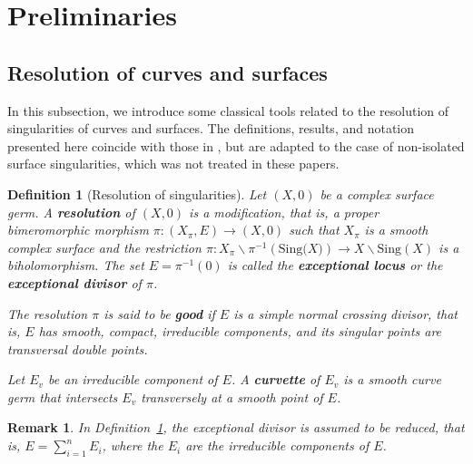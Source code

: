 \documentclass[reqno,dvipsnames,12pt]{amsart}
\renewcommand{\setminus}{\smallsetminus}
\newtheorem{rema}[thm]{Remark}
\newtheorem{defi}[thm]{Definition}
\begin{document}
\newpage






\tableofcontents
\section{Preliminaries}





\subsection{Resolution of curves and surfaces}\label{section1}

In this subsection, we introduce some classical tools related to the resolution of singularities of curves and surfaces. The definitions, results, and notation presented here coincide with those in \cite{yenni1, yenni2}, but are adapted to the case of non-isolated surface singularities, which was not treated in these papers.






\begin{defi}[Resolution of singularities]\label{Resolution of singularities}
Let $(X,0)$ be a complex surface germ. A \textbf{resolution} of $(X,0)$ is a \textit{modification}, that is, a proper bimeromorphic morphism
$\pi : (X_\pi, E) \to (X,0)$
such that $X_\pi$ is a smooth complex surface and the restriction
$\pi : X_\pi \setminus \pi^{-1}\left({\mathrm{Sing}(X}) \right)\to X \setminus \mathrm{Sing}(X)$
is a biholomorphism. The set $E = \pi^{-1}(0)$ is called the \textbf{exceptional locus} or the \textbf{exceptional divisor} of $\pi$.

The resolution $\pi$ is said to be \textbf{good} if $E$ is a \emph{simple normal crossing divisor}, that is, $E$ has smooth, compact, irreducible components, and its singular points are transversal double points. 

Let $E_v$ be an irreducible component of $E$. A \textbf{curvette} of $E_v$ is a smooth curve germ that intersects $E_v$ transversely at a smooth point of $E$.
\end{defi}


\begin{rema}
In Definition~\ref{Resolution of singularities}, the exceptional divisor is assumed to be reduced, that is,
$E=\sum_{i=1}^n E_i$, where the $E_i$ are the irreducible components of $E$.
\end{rema}
\end{document}
